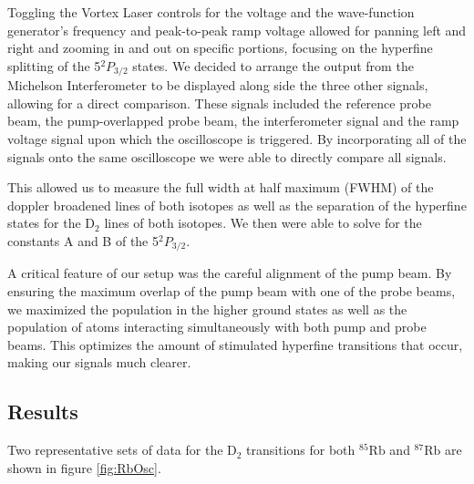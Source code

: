 \documentclass[12pt]{article}
\begin{document}
Toggling the Vortex Laser controls for the voltage and the wave-function generator's frequency and peak-to-peak ramp voltage allowed for panning left and right and zooming in and out on specific portions, focusing on the hyperfine splitting of the 5$^2P_{3/2} $ states.  We decided to arrange the output from the Michelson Interferometer to be displayed along side the three other signals, allowing for a direct comparison. These signals included the reference probe beam, the pump-overlapped probe beam, the interferometer signal and the ramp voltage signal upon which the oscilloscope is triggered.  By incorporating all of the signals onto the same oscilloscope we were able to directly compare all signals.

This allowed us to measure the full width at half maximum (FWHM) of the doppler broadened lines of both isotopes as well as the separation of the hyperfine states for the D$_2$ lines of both isotopes. We then were able to solve for the constants A and B of the 5$^2 P_{3/2}$.

A critical feature of our setup was the careful alignment of the pump beam.  By ensuring the maximum overlap of the pump beam with one of the probe beams, we maximized the population in the higher ground states as well as the population of atoms interacting simultaneously with both pump and probe beams.  This optimizes the amount of stimulated hyperfine transitions that occur, making our signals much clearer.

\subsection*{Results}

Two representative sets of data for the D$_2$ transitions for both ${}^{85}\text{Rb}$ and ${}^{87}\text{Rb}$ are shown in figure \ref{fig:RbOsc}.
\end{document}
